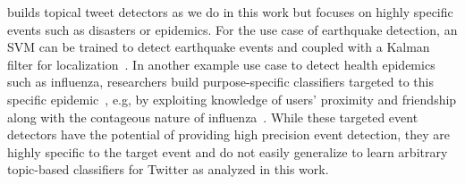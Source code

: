 
\vspace{2mm}
 builds topical tweet detectors 
as we do in this work but focuses on highly specific events 
such as disasters or epidemics.  For the use case of earthquake
detection, an SVM can be trained to detect earthquake events
and coupled with a Kalman filter for localization~\cite{sakakiEq2}.
%
%
%
In another example use case to detect health epidemics such as
influenza, researchers build purpose-specific classifiers targeted to
this specific epidemic~\cite{culotta,aramaki}, e.g, by exploiting
knowledge of users' proximity and friendship along with the contageous
nature of influenza~\cite{sadilek}.  While these targeted event
detectors have the potential of providing high precision event
detection, they are highly specific to the target event and do not
easily generalize to learn arbitrary topic-based classifiers
for Twitter as analyzed in this work.

